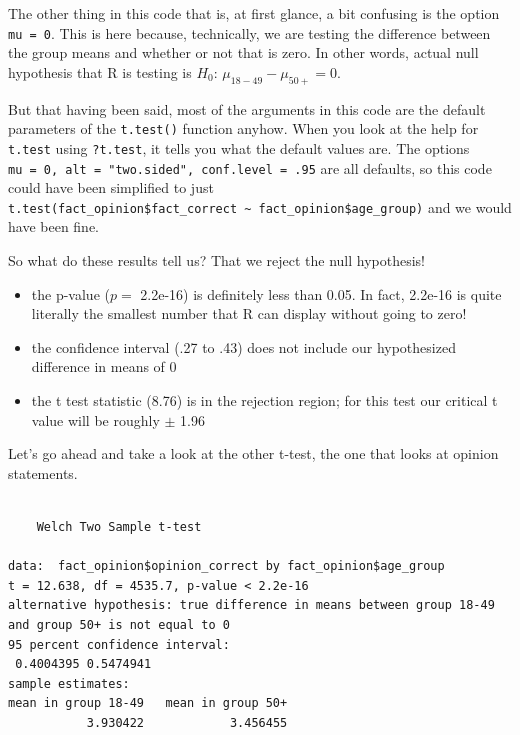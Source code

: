 \documentclass[
  letterpaper,
]{book}
\newenvironment{Shaded}{\begin{snugshade}}{\end{snugshade}}
\newcommand{\AttributeTok}[1]{\textcolor[rgb]{0.40,0.45,0.13}{#1}}
\newcommand{\DecValTok}[1]{\textcolor[rgb]{0.68,0.00,0.00}{#1}}
\newcommand{\FunctionTok}[1]{\textcolor[rgb]{0.28,0.35,0.67}{#1}}
\newcommand{\NormalTok}[1]{\textcolor[rgb]{0.00,0.23,0.31}{#1}}
\newcommand{\SpecialCharTok}[1]{\textcolor[rgb]{0.37,0.37,0.37}{#1}}
\newcommand{\StringTok}[1]{\textcolor[rgb]{0.13,0.47,0.30}{#1}}
\providecommand{\tightlist}{%
  \setlength{\itemsep}{0pt}\setlength{\parskip}{0pt}}\usepackage{longtable,booktabs,array}
\begin{document}
The other thing in this code that is, at first glance, a bit confusing
is the option \texttt{mu\ =\ 0}. This is here because, technically, we
are testing the difference between the group means and whether or not
that is zero. In other words, actual null hypothesis that R is testing
is \(H_0\): \(\mu_{18-49} - \mu_{50+} = 0\).

But that having been said, most of the arguments in this code are the
default parameters of the \texttt{t.test()} function anyhow. When you
look at the help for \texttt{t.test} using \texttt{?t.test}, it tells
you what the default values are. The options
\texttt{mu\ =\ 0,\ alt\ =\ "two.sided",\ conf.level\ =\ .95} are all
defaults, so this code could have been simplified to just
\texttt{t.test(fact\_opinion\$fact\_correct\ \textasciitilde{}\ fact\_opinion\$age\_group)}
and we would have been fine.

So what do these results tell us? That we reject the null hypothesis!

\begin{itemize}
\tightlist
\item
  the p-value (\(p=\) 2.2e-16) is definitely less than 0.05. In fact,
  2.2e-16 is quite literally the smallest number that R can display
  without going to zero!
\item
  the confidence interval (.27 to .43) does not include our hypothesized
  difference in means of 0
\item
  the t test statistic (8.76) is in the rejection region; for this test
  our critical t value will be roughly \(\pm\) 1.96
\end{itemize}

Let's go ahead and take a look at the other t-test, the one that looks
at opinion statements.

\begin{Shaded}
\end{Shaded}

\begin{verbatim}

    Welch Two Sample t-test

data:  fact_opinion$opinion_correct by fact_opinion$age_group
t = 12.638, df = 4535.7, p-value < 2.2e-16
alternative hypothesis: true difference in means between group 18-49 and group 50+ is not equal to 0
95 percent confidence interval:
 0.4004395 0.5474941
sample estimates:
mean in group 18-49   mean in group 50+ 
           3.930422            3.456455 
\end{verbatim}
\end{document}
